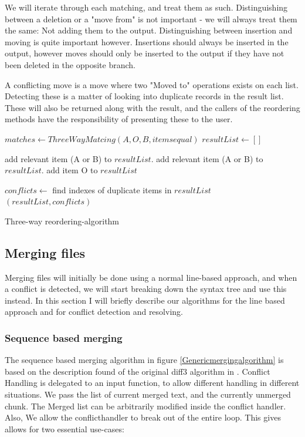 \documentclass[11pt]{article}
\begin{document}
We will iterate through each matching, and treat them as such. Distinguishing between a deletion or a "move from" is not important - we will always treat them the same: Not adding them to the output. Distinguishing between insertion and moving is quite important however. Insertions should always be inserted in the output, however moves should only be inserted to the output if they have not been deleted in the opposite branch. 

A conflicting move is a move where two "Moved to" operations exists on each list. Detecting these is a matter of looking into duplicate records in the result list. These will also be returned along with the result, and the callers of the reordering methods have the responsibility of presenting these to the user.




\begin{algorithm}
\begin{algorithmic}
   \State $matches \gets ThreeWayMatcing(A, O, B, items equal)$
   \State $resultList \gets []$
   
         \State add relevant item (A or B) to $resultList$.
      \EndIf
         \State add relevant item (A or B) to $resultList$.
      \EndIf
         \State add item O to $resultList$
      \EndIf
      
	\EndFor
	\State $conflicts \gets$ find indexes of duplicate items in $resultList$
	\State \Return $(resultList, conflicts)$
\EndFunction
\end{algorithmic}
\caption{Three-way reordering-algorithm}
  \label{ThreeWayReorderingAlgorithm}
\end{algorithm}

\subsection{Merging files}
Merging files will initially be done using a normal line-based approach, and when a conflict is detected, we will start breaking down the syntax tree and use this instead. In this section I will briefly describe our algorithms for the line based approach and for conflict detection and resolving.

\subsubsection{Sequence based merging}
The sequence based merging algorithm in figure \ref{Genericmergingalgorithm} is based on the description found of the original diff3 algorithm in \citet{Khanna}. Conflict Handling is delegated to an input function, to allow different handling in different situations. We pass the list of current merged text, and the currently unmerged chunk. The Merged list can be arbitrarily modified inside the conflict handler. Also, We allow the conflicthandler to break out of the entire loop. This gives allows for two essential use-cases:
\end{document}
